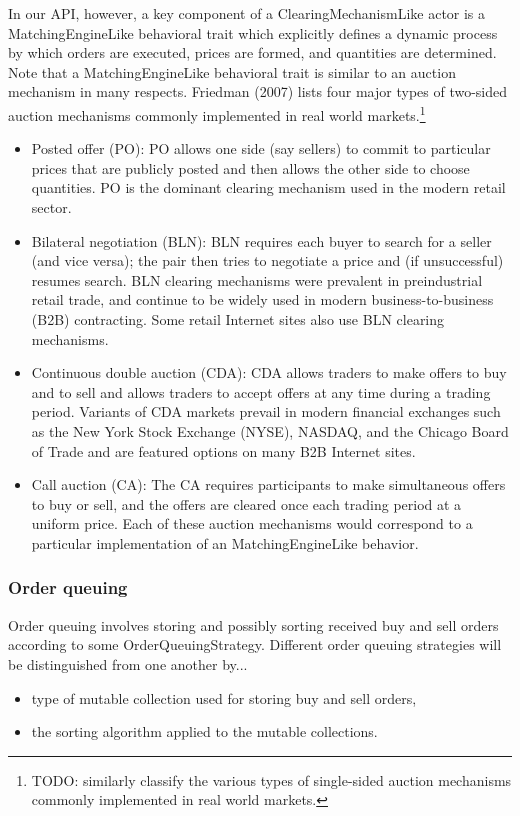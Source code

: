 \documentclass[a4paper]{article}
\begin{document}
In our API, however, a key component of a ClearingMechanismLike actor is a MatchingEngineLike behavioral trait which explicitly defines a dynamic process by which orders are executed, prices are formed, and quantities are determined. Note that a MatchingEngineLike behavioral trait is similar to an auction mechanism in many respects. Friedman (2007) lists four major types of two-sided auction mechanisms commonly implemented in real world markets.\footnote{
%
TODO: similarly classify the various types of single-sided auction mechanisms commonly implemented
in real world markets.
%
}
\begin{itemize}
    \item Posted offer (PO): PO allows one side (say sellers) to commit to particular prices that are publicly posted and then allows the other side to choose quantities. PO is the dominant clearing mechanism used in the modern retail sector.
    \item Bilateral negotiation (BLN): BLN requires each buyer to search for a seller (and vice versa); the pair then tries to negotiate a price and (if unsuccessful) resumes search. BLN clearing mechanisms were prevalent in preindustrial retail trade, and continue to be widely used in modern business-to-business (B2B) contracting. Some retail Internet sites also use BLN clearing mechanisms.
    \item Continuous double auction (CDA): CDA allows traders to make offers to buy and to sell and allows traders to accept offers at any time during a trading period. Variants of CDA markets prevail in modern financial exchanges such as the New York Stock Exchange (NYSE), NASDAQ, and the Chicago Board of Trade and are featured options on many B2B Internet sites.
    \item Call auction (CA): The CA requires participants to make simultaneous offers to buy or sell, and the offers are cleared once each trading period at a uniform price. Each of these auction mechanisms would correspond to a particular implementation of an MatchingEngineLike behavior.
\end{itemize}

\subsubsection{Order queuing} Order queuing involves storing and possibly sorting received buy and sell orders according to some OrderQueuingStrategy. Different order queuing strategies will be distinguished from one another by...
\begin{itemize}
    \item type of mutable collection used for storing buy and sell orders,
    \item the sorting algorithm applied to the mutable collections.
\end{itemize}
\end{document}
